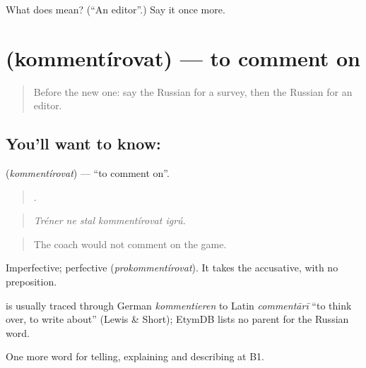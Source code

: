 \begin{tcolorbox}[breakable,colback=teal!4,colframe=teal!35!black,title={Before you move on}]
What does  mean? (\textquotedblleft{}An editor\textquotedblright{}.) Say it once more.
\end{tcolorbox}
\section[\texorpdfstring{\ru{комментировать} (kommentírovat)}{комментировать (kommentírovat)}]{ (kommentírovat) — to comment on}

\label{lesson:RU-C284-kommentirovat}



\begin{quote}
Before the new one: say the Russian for a survey, then the Russian for an editor.
\end{quote}

\subsection*{You'll want to know: }
\textbf{} (\emph{kommentírovat}) — \textquotedblleft{}to comment on\textquotedblright{}.

\begin{quote}
    .
\end{quote}

\begin{quote}
\emph{Tréner ne stal kommentírovat igrú.}
\end{quote}

\begin{quote}
The coach would not comment on the game.
\end{quote}

Imperfective; perfective \emph{} (\emph{prokommentírovat}). It takes the accusative, with no preposition.

\begin{cousinweb}
\emph{} is usually traced through German \emph{kommentieren} to Latin \emph{commentārī} \textquotedblleft{}to think over, to write about\textquotedblright{} (Lewis \& Short); EtymDB lists no parent for the Russian word.
\end{cousinweb}

\begin{grammarlens}[title={What you've built}]
One more word for telling, explaining and describing at B1.
\end{grammarlens}

